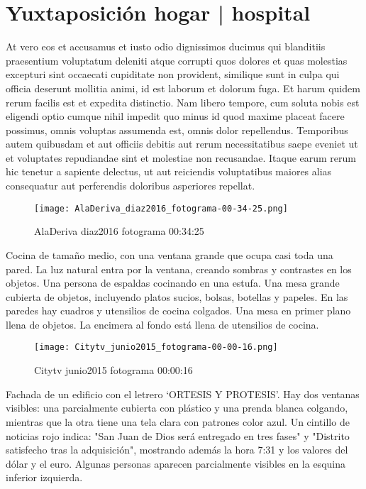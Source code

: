 \clearpage

\section{Yuxtaposición hogar | hospital}

At vero eos et accusamus et iusto odio dignissimos ducimus qui blanditiis praesentium voluptatum deleniti atque corrupti quos dolores et quas molestias excepturi sint occaecati cupiditate non provident, similique sunt in culpa qui officia deserunt mollitia animi, id est laborum et dolorum fuga. Et harum quidem rerum facilis est et expedita distinctio. Nam libero tempore, cum soluta nobis est eligendi optio cumque nihil impedit quo minus id quod maxime placeat facere possimus, omnis voluptas assumenda est, omnis dolor repellendus. Temporibus autem quibusdam et aut officiis debitis aut rerum necessitatibus saepe eveniet ut et voluptates repudiandae sint et molestiae non recusandae. Itaque earum rerum hic tenetur a sapiente delectus, ut aut reiciendis voluptatibus maiores alias consequatur aut perferendis doloribus asperiores repellat.

\clearpage
\begin{figure}[h!]
    \centering
    \texttt{[image: AlaDeriva\_diaz2016\_fotograma-00-34-25.png]}
    \caption{AlaDeriva diaz2016 fotograma 00:34:25}
    \label{fig:AlaDeriva_diaz2016_fotograma_00_34_25}
\end{figure}

Cocina de tamaño medio, con una ventana grande que ocupa casi toda una pared. La luz natural entra por la ventana, creando sombras y contrastes en los objetos. Una persona de espaldas cocinando en una estufa. Una mesa grande cubierta de objetos, incluyendo platos sucios, bolsas, botellas y papeles. En las paredes hay cuadros y utensilios de cocina colgados. Una mesa en primer plano llena de objetos. La encimera al fondo está llena de utensilios de cocina. \parencite[fotograma: 00:34:25]{AlaDeriva_diaz2016}

\clearpage
\begin{figure}[h!]
    \centering
    \texttt{[image: Citytv\_junio2015\_fotograma-00-00-16.png]}
    \caption{Citytv junio2015 fotograma 00:00:16}
    \label{fig:Citytv_junio2015_fotograma_00_00_16}
\end{figure}


Fachada de un edificio con el letrero `ORTESIS Y PROTESIS'. Hay dos ventanas visibles: una parcialmente cubierta con plástico y una prenda blanca colgando, mientras que la otra tiene una tela clara con patrones color azul. Un cintillo de noticias rojo indica: "San Juan de Dios será entregado en tres fases" y "Distrito satisfecho tras la adquisición", mostrando además la hora 7:31 y los valores del dólar y el euro. Algunas personas aparecen parcialmente visibles en la esquina inferior izquierda. \parencite[fotograma: 00:00:16]{Citytv_junio2015}

